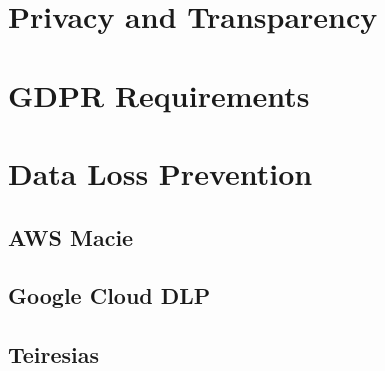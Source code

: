 


\graphicspath{{3/figures/}}

\section{Privacy and Transparency}
\section{GDPR Requirements}
\section{Data Loss Prevention}
\subsection{AWS Macie}
\subsection{Google Cloud DLP}
\subsection{Teiresias}


%




